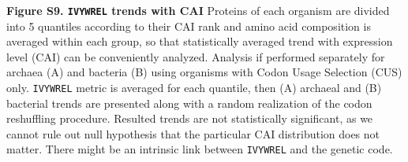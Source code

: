 \documentclass{report}
\begin{document}


{\bf Figure S9. \texttt{IVYWREL} trends with CAI} Proteins of each organism are divided into 5 quantiles according to their CAI rank and amino acid composition is averaged within each group, so that statistically averaged trend with expression level (CAI) can be conveniently analyzed. Analysis if performed separately for archaea (A) and bacteria (B) using organisms with Codon Usage Selection (CUS) only. \texttt{IVYWREL} metric is averaged for each quantile, then (A) archaeal and (B) bacterial trends are presented along with a random realization of the codon reshuffling procedure. Resulted trends are not statistically significant, as we cannot rule out null hypothesis that the particular CAI distribution does not matter. There might be an intrinsic link between \texttt{IVYWREL} and the genetic code.

\begin{figure}[h!]
	\centering
\end{figure}







\end{document}
